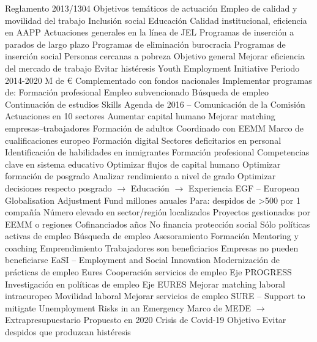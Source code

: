 \documentclass{nuevotema}
\begin{document}
\begin{esquemal}
				\4 Reglamento 2013/1304
				\4[] Objetivos temáticos de actuación
				\4[8] Empleo de calidad y movilidad del trabajo
				\4[9] Inclusión social
				\4[10] Educación
				\4[11] Calidad institucional, eficiencia en AAPP
				\4 Actuaciones generales en la línea de JEL
				\4 Programas de inserción a parados de largo plazo
				\4 Programas de eliminación burocracia
				\4 Programas de inserción social
				\4[] Personas cercanas a pobreza
				\4 Objetivo general
				\4[] Mejorar eficiencia del mercado de trabajo
				\4[] Evitar histéresis
			\3 Youth Employment Initiative
				\4 Periodo 2014-2020
				 M de €
				\4 Complementado con fondos nacionales
				\4 Implementar programas de:
				\4[] Formación profesional
				\4[] Empleo subvencionado
				\4[] Búsqueda de empleo
				\4[] Continuación de estudios
			\3 Skills Agenda de 2016 -- Comunicación de la Comisión
				\4 Actuaciones en 10 sectores
				\4[] Aumentar capital humano
				\4[] Mejorar matching empresas--trabajadores
				\4 Formación de adultos
				\4[] Coordinado con EEMM
				\4 Marco de cualificaciones europeo
				\4 Formación digital
				\4 Sectores deficitarios en personal
				\4 Identificación de habilidades en inmigrantes
				\4 Formación profesional
				\4 Competencias clave en sistema educativo
				\4 Optimizar flujos de capital humano
				\4 Optimizar formación de posgrado
				\4[] Analizar rendimiento a nivel de grado
				\4[] Optimizar decisiones respecto posgrado
				\4[] $\to$ Educación
				\4[] $\to$ Experiencia
			\3 EGF -- European Globalisation Adjustment Fund
				 millones anuales
				\4 Para:
				\4[] despidos de >500 por 1 compañía
				\4[] Número elevado en sector/región localizados
				\4 Proyectos gestionados por EEMM o regiones
				\4 Cofinanciados
				\4 2 años
				\4 No financia protección social
				\4 Sólo políticas activas de empleo
				\4[] Búsqueda de empleo
				\4[] Asesoramiento
				\4[] Formación
				\4[] Mentoring y coaching
				\4[] Emprendimiento
				\4 Trabajadores son beneficiarios
				\4 Empresas no pueden beneficiarse
			\3 EaSI -- Employment and Social Innovation
				\4 Modernización de prácticas de empleo
				\4 Eures
				\4[] Cooperación servicios de empleo
				\4 Eje PROGRESS
				\4[] Investigación en políticas de empleo
				\4 Eje EURES
				\4[] Mejorar matching laboral intraeuropeo
				\4[] Movilidad laboral
				\4[] Mejorar servicios de empleo
			\3 SURE -- Support to mitigate Unemployment Risks in an Emergency
				\4 Marco de MEDE
				\4[] $\to$ Extrapresupuestario
				\4 Propuesto en 2020
				\4[] Crisis de Covid-19
				\4 Objetivo
				\4[] Evitar despidos que produzcan histéresis

\end{esquemal}
\end{document}
